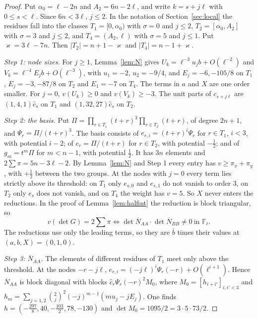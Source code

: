 \documentclass[11pt]{amsart}
\theoremstyle{definition}
\theoremstyle{remark}
\numberwithin{equation}{section}
\newcommand{\F}{\mathbb F}
\begin{document}
\begin{proof}
Put $\alpha_0=\ell-2n$ and $A_2=6n-2\ell$, and write $k=s+j\ell$ with $0\le s<\ell$. Since $6n<3\ell$, $j\le2$. In the
notation of Section~\ref{sec:local} the residues fall into the classes $T_1=[0,\alpha_0)$ with $\sigma=0$ and $j\le2$,
$T_2=[\alpha_0,A_2]$ with $\sigma=3$ and $j\le2$, and $T_4=(A_2,\ell)$ with $\sigma=5$ and $j\le1$. Put $\varkappa=3\ell-7n$.
Then $|T_2|=n+1-\varkappa$ and $|T_4|=n-1+\varkappa$.

\emph{Step 1: node sizes.} For $j\ge1$, Lemma~\ref{lem:N} gives $U_k=\ell^{-3}u_jb+O(\ell^{-2})$ and
$V_k=\ell^{-4}E_jb+O(\ell^{-3})$, with $u_1=-2$, $u_2=-9/4$, and $E_j=-6,-105/8$ on $T_1$, $E_j=-3,-87/8$ on $T_2$ and
$E_1=-7$ on $T_4$. The terms in $a$ and $X$ are one order smaller. For $j=0$, $v(U_k)\ge0$ and $v(V_k)\ge-3$. The unit parts
of $c_{s+j\ell}$ are $(1,4,1)\hat c_s$ on $T_1$ and $(1,32,27)\hat c_s$ on $T_2$.

\emph{Step 2: the basis.} Put $\Pi=\prod_{r\in T_1}(t+r)^3\prod_{r\in T_2}(t+r)$, of degree $2n+1$, and
$\Psi_r=\Pi/(t+r)^3$. The basis consists of $e_{r,i}=(t+r)^i\Psi_r$ for $r\in T_1$, $i<3$, with potential $i-2$; of
$e_r=\Pi/(t+r)$ for $r\in T_2$, with potential $-\frac12$; and of $g_m=t^m\Pi$ for $m<n-1$, with potential $\frac12$. It
has $3n$ elements and $2\sum\pi=5n-3\ell-2$. By Lemma~\ref{lem:N} and Step 1 every entry has $v\ge\pi_x+\pi_y$, with
$+\frac12$ between the two groups. At the nodes with $j=0$ every term lies strictly above its threshold: on $T_1$ only
$e_{s,0}$ and $e_{s,1}$ do not vanish to order $3$, on $T_2$ only $e_s$ does not vanish, and on $T_4$ the weight has
$v=5$. So $X$ never enters the reductions. In the proof of Lemma~\ref{lem:halfint} the reduction is block triangular, so
\[
 v(\det G)=2\sum\pi\iff\det\overline N_{AA}\cdot\det\overline N_{BB}\ne0\ \text{in }\F_\ell .
\]
The reductions use only the leading terms, so they are $\bar b$ times their values at $(a,b,X)=(0,1,0)$.

\emph{Step 3: $\overline N_{AA}$.} The elements of different residues of $T_1$ meet only above the threshold. At the
nodes $-r-j\ell$, $e_{r,i}=(-j\ell)^i\Psi_r(-r)+O(\ell^{i+1})$. Hence $\overline N_{AA}$ is block diagonal with blocks
$\hat c_r\Psi_r(-r)^2M_0$, where $M_0=[h_{i+i'}]_{i,i'<3}$ and $h_m=\sum_{j=1,2}\binom2j^2(-j)^{m-1}(mu_j-jE_j)$. One finds
$h=(-\frac{297}8,40,-\frac{103}2,78,-130)$ and $\det M_0=1095/2=3\cdot5\cdot73/2$.


\end{proof}
\end{document}
